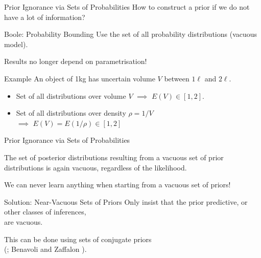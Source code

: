 \documentclass{beamer}
\begin{document}
\begin{frame}{Prior Ignorance via Sets of Probabilities}
   How to construct a prior if we do not have a lot of information?
\pause
  \begin{block}{Boole: Probability Bounding}
    Use the set of all probability distributions (\alert{vacuous model}).
  \end{block}
  Results no longer depend on parametrisation!
\pause
  \begin{exampleblock}{Example}
    An object of 1kg has uncertain volume $V$ between $1\ell$ and $2\ell$.
    \begin{itemize}
    \item<4-> Set of all distributions over volume $V$ $\implies$ $E(V)\in[1,2]$.
    \item<5-> Set of all distributions over density $\rho=1/V$\\
      \hspace*{31ex} $\implies$ $E(V)=E(1/\rho)\in[1,2]$
    \end{itemize}
  \end{exampleblock}
\vspace*{8.25ex}
\end{frame}

\begin{frame}{Prior Ignorance via Sets of Probabilities}
  \begin{theorem}
    The set of posterior distributions
    resulting from a vacuous set of prior distributions
    is again vacuous,
    regardless of the likelihood.
  \end{theorem}
  \alert{We can never learn anything when starting from a vacuous set of priors!}
\pause
  \begin{alertblock}{Solution: Near-Vacuous Sets of Priors}
    Only insist that the prior predictive, or other classes of inferences,\\ are vacuous.
  \end{alertblock}
  This can be done using sets of conjugate priors\\
  (\cite{1996:walley::idm}; Benavoli and Zaffalon \cite*{2012:benavolizaffalon,2015:benavolizaffalon}).
\end{frame}
\end{document}
